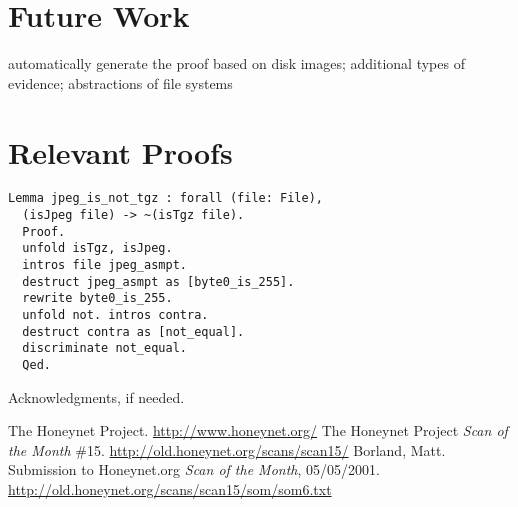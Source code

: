 \documentclass[nocopyrightspace]{sigplanconf}
\begin{document}
\section{Future Work}

automatically generate the proof based on disk images; additional types of
evidence; abstractions of file systems


\appendix
\section{Relevant Proofs}

\begin{lstlisting}
Lemma jpeg_is_not_tgz : forall (file: File),
  (isJpeg file) -> ~(isTgz file).
  Proof.
  unfold isTgz, isJpeg.
  intros file jpeg_asmpt.
  destruct jpeg_asmpt as [byte0_is_255].
  rewrite byte0_is_255.
  unfold not. intros contra.
  destruct contra as [not_equal].
  discriminate not_equal.
  Qed.
\end{lstlisting}

\acks

Acknowledgments, if needed.





\begin{thebibliography}{}
\softraggedright

The Honeynet Project. \url{http://www.honeynet.org/}
The Honeynet Project \emph{Scan of the Month} \#15.
\url{http://old.honeynet.org/scans/scan15/}
Borland, Matt. Submission to Honeynet.org \emph{Scan of the Month},
05/05/2001. \url{http://old.honeynet.org/scans/scan15/som/som6.txt}

\end{thebibliography}
\end{document}
